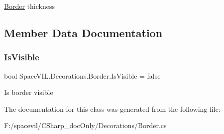 \mbox{\hyperlink{class_space_v_i_l_1_1_decorations_1_1_border}{Border}} thickness 



\subsection{Member Data Documentation}
\mbox{\label{class_space_v_i_l_1_1_decorations_1_1_border_a47746be2515f5c1e5164836c42665bac}} 
\subsubsection{\texorpdfstring{Is\+Visible}{IsVisible}}
{\footnotesize\ttfamily bool Space\+V\+I\+L.\+Decorations.\+Border.\+Is\+Visible = false}



Is border visible 



The documentation for this class was generated from the following file\+:\begin{DoxyCompactItemize}
\item 
F\+:/spacevil/\+C\+Sharp\+\_\+doc\+Only/\+Decorations/Border.\+cs\end{DoxyCompactItemize}
